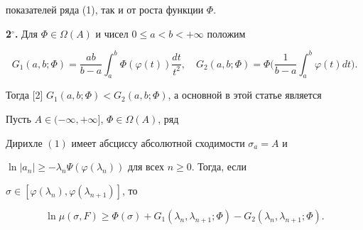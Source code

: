 показателей ряда (1), так и от роста функции $\Phi$.


\medskip





{\bf 2${}^\circ$.} Для $\Phi\in\Omega(A)$ и чисел $0\le a<b<+\infty$ положим


$$


G_1(a,b;\Phi)=\frac{ab}{b-a}\int_a^b \Phi(\varphi(t))\frac{dt}{t^2},


\quad


G_2(a,b;\Phi)=\Phi\bigg(\frac{1}{b-a}\int_a^b \varphi(t)dt\bigg).


$$


Тогда [2] $G_1(a,b;\Phi)<G_2(a,b;\Phi)$, а основной в этой статье является





\begin{thm} Пусть $A\in(-\infty, +\infty]$, $\Phi\in\Omega(A)$, ряд 


Дирихле $(1)$ имеет абсциссу абсолютной сходимости $\sigma_a=A$ и


$\ln|a_n|\ge-\lambda_n\Psi(\varphi(\lambda_n))$ для всех $n\ge 0$. Тогда, если


$\sigma\in [\varphi(\lambda_n),\varphi(\lambda_{n+1})]$, то


\begin{equation}


\ln\mu(\sigma,F)\ge \Phi(\sigma)+G_1(\lambda_n,\lambda_{n+1};\Phi)-


G_2(\lambda_n,\lambda_{n+1};\Phi).


\end{equation}


\end{thm}





